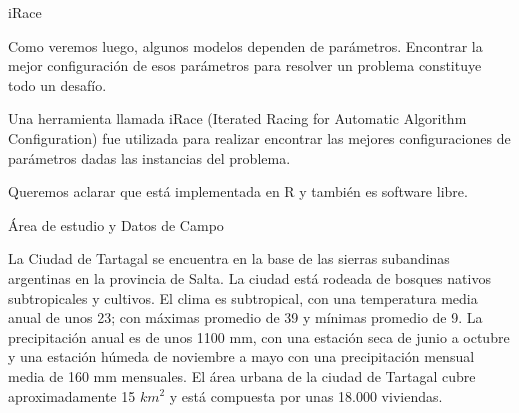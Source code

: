 \documentclass[10pt]{beamer}
\begin{document}
\begin{frame}{iRace}

  Como veremos luego, algunos modelos dependen de parámetros. Encontrar la mejor
  configuración de esos parámetros para resolver un problema constituye todo un
  desafío.

  Una herramienta llamada iRace (Iterated Racing for Automatic Algorithm
  Configuration) fue utilizada para realizar encontrar las mejores
  configuraciones de parámetros dadas las instancias del problema.

  Queremos aclarar que está implementada en R y también es software libre.

\end{frame}

\begin{frame}{Área de estudio y Datos de Campo}

La Ciudad de Tartagal se encuentra en la base de las sierras subandinas
argentinas en la provincia de Salta. La ciudad está rodeada de bosques nativos
subtropicales y cultivos. El clima es subtropical, con una temperatura media
anual de unos 23; con máximas promedio de 39 y mínimas promedio de 9. La
precipitación anual es de unos 1100 mm, con una estación seca de junio a octubre
y una estación húmeda de noviembre a mayo con una precipitación mensual media de
160 mm mensuales. El área urbana de la ciudad de Tartagal cubre aproximadamente
15 $km^2$ y está compuesta por unas 18.000 viviendas.


\end{frame}
\end{document}
